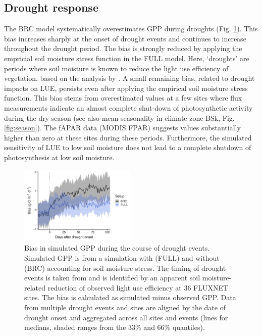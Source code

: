 \documentclass{myreport}
\begin{document}
\subsection{Drought response}
\label{sec:results_droughtresponse}

The BRC model systematically overestimates GPP during droughts (Fig. \ref{fig:modobs_droughtresponse}). This bias increases sharply at the onset of drought events and continues to increase throughout the drought period. The bias is strongly reduced by applying the empricial soil moisture stress function in the FULL model. Here, `droughts' are periods where soil moisture is known to reduce the light use efficiency of vegetation, based on the analysis by \cite{stocker18newphyt}. A small remaining bias, related to drought impacts on LUE, persists even after applying the empirical soil moisture stress function. This bias stems from overestimated values at a few sites where flux measurements indicate an almost complete shut-down of photosynthetic activity during the dry season (see also mean seasonality in climate zone BSk, Fig. \ref{fig:season}). The fAPAR data (MODIS FPAR) suggests values substantially higher than zero at these sites during these periods. Furthermore, the simulated sensitivity of LUE to low soil moisture does not lead to a complete shutdown of photosynthesis at low soil moisture.

\begin{figure}[!ht]
    \centering
\includegraphics[width=0.5\textwidth]{fig/droughtresponse.pdf}
    \caption{Bias in simulated GPP during the course of drought events. Simulated GPP is from a simulation with (FULL) and without (BRC) accounting for soil moisture stress. The timing of drought events is taken from \cite{stocker18newphyt} and is identified by an apparent soil moisture-related reduction of observed light use efficiency at 36 FLUXNET sites. The bias is calculated as simulated minus observed GPP. Data from multiple drought events and sites are aligned by the date of drought onset and aggregated across all sites and events (lines for medians, shaded ranges from the 33\% and 66\% quantiles).}
    \label{fig:modobs_droughtresponse}
\end{figure}
\end{document}
